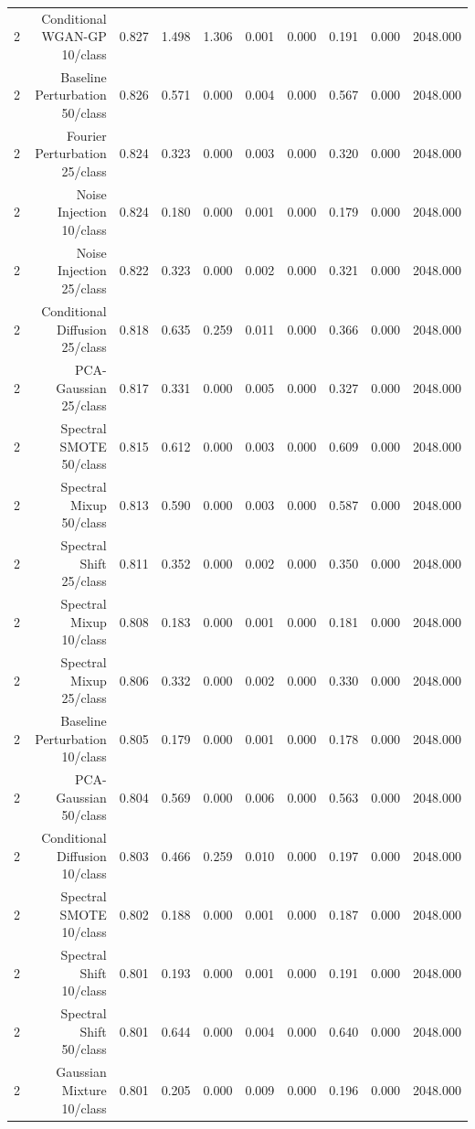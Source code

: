\begin{table}[t]
\begin{tabular}{lrrrrrrrrr}
2 & Conditional WGAN-GP 10/class & 0.827 & 1.498 & 1.306 & 0.001 & 0.000 & 0.191 & 0.000 & 2048.000 \\
2 & Baseline Perturbation 50/class & 0.826 & 0.571 & 0.000 & 0.004 & 0.000 & 0.567 & 0.000 & 2048.000 \\
2 & Fourier Perturbation 25/class & 0.824 & 0.323 & 0.000 & 0.003 & 0.000 & 0.320 & 0.000 & 2048.000 \\
2 & Noise Injection 10/class & 0.824 & 0.180 & 0.000 & 0.001 & 0.000 & 0.179 & 0.000 & 2048.000 \\
2 & Noise Injection 25/class & 0.822 & 0.323 & 0.000 & 0.002 & 0.000 & 0.321 & 0.000 & 2048.000 \\
2 & Conditional Diffusion 25/class & 0.818 & 0.635 & 0.259 & 0.011 & 0.000 & 0.366 & 0.000 & 2048.000 \\
2 & PCA-Gaussian 25/class & 0.817 & 0.331 & 0.000 & 0.005 & 0.000 & 0.327 & 0.000 & 2048.000 \\
2 & Spectral SMOTE 50/class & 0.815 & 0.612 & 0.000 & 0.003 & 0.000 & 0.609 & 0.000 & 2048.000 \\
2 & Spectral Mixup 50/class & 0.813 & 0.590 & 0.000 & 0.003 & 0.000 & 0.587 & 0.000 & 2048.000 \\
2 & Spectral Shift 25/class & 0.811 & 0.352 & 0.000 & 0.002 & 0.000 & 0.350 & 0.000 & 2048.000 \\
2 & Spectral Mixup 10/class & 0.808 & 0.183 & 0.000 & 0.001 & 0.000 & 0.181 & 0.000 & 2048.000 \\
2 & Spectral Mixup 25/class & 0.806 & 0.332 & 0.000 & 0.002 & 0.000 & 0.330 & 0.000 & 2048.000 \\
2 & Baseline Perturbation 10/class & 0.805 & 0.179 & 0.000 & 0.001 & 0.000 & 0.178 & 0.000 & 2048.000 \\
2 & PCA-Gaussian 50/class & 0.804 & 0.569 & 0.000 & 0.006 & 0.000 & 0.563 & 0.000 & 2048.000 \\
2 & Conditional Diffusion 10/class & 0.803 & 0.466 & 0.259 & 0.010 & 0.000 & 0.197 & 0.000 & 2048.000 \\
2 & Spectral SMOTE 10/class & 0.802 & 0.188 & 0.000 & 0.001 & 0.000 & 0.187 & 0.000 & 2048.000 \\
2 & Spectral Shift 10/class & 0.801 & 0.193 & 0.000 & 0.001 & 0.000 & 0.191 & 0.000 & 2048.000 \\
2 & Spectral Shift 50/class & 0.801 & 0.644 & 0.000 & 0.004 & 0.000 & 0.640 & 0.000 & 2048.000 \\
2 & Gaussian Mixture 10/class & 0.801 & 0.205 & 0.000 & 0.009 & 0.000 & 0.196 & 0.000 & 2048.000 \\

\end{tabular}
\end{table}
